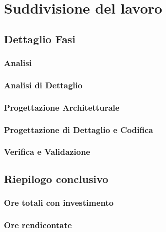 \section{Suddivisione del lavoro}
\subsection{Dettaglio Fasi}
\subsubsection{Analisi}
\subsubsection{Analisi di Dettaglio}
\subsubsection{Progettazione Architetturale}
\subsubsection{Progettazione di Dettaglio e Codifica}
\subsubsection{Verifica e Validazione}
\subsection{Riepilogo conclusivo}
\subsubsection{Ore totali con investimento}
\subsubsection{Ore rendicontate}